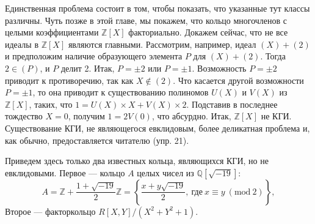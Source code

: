 \documentclass{mai_book}
\begin{document}
\begin{myproof}
Единственная проблема состоит в том, чтобы показать, что  
указанные тут классы различны. Чуть позже в этой главе, мы покажем, 
что кольцо многочленов с целыми коэффициентами $\mathbb{Z}[X]$  
факториально. Докажем сейчас, что не все идеалы в $\mathbb{Z}[X]$ являются  
главными. Рассмотрим, например, идеал $(X) + (2)$ и предположим наличие 
образующего элемента $P$ для $(X) + (2)$. Тогда $2 \in (P)$, и $P$ делит 2. 
Итак, $P = ±2$ или $P = ±1$. Возможность $P = ±2$ приводит к 
противоречию, так как $X \notin (2)$. Что касается другой  
возможности $P = ±1$, то она приводит к существованию полиномов $U(X)$ 
и $V(X)$ из $\mathbb{Z}[X]$, таких, что $1 = U(X) \times X + V(X) \times 2$. Подставив 
в последнее тождество $X = 0$, получим $1 = 2V(0)$, что абсурдно. 
Итак, $\mathbb{Z}[X]$ не КГИ. Существование КГИ, не являющегося  
евклидовым, более деликатная проблема и, как обычно, предоставляется 
читателю (упр. 21).

\noindent Приведем здесь только два известных кольца, являющихся КГИ, но 
не евклидовыми. Первое — кольцо $A$ целых чисел из $\mathbb{Q}[\sqrt{-19}]$:
\begin{equation*}
A = \mathbb{Z} + \frac{1 + \sqrt{-19}}{2}\mathbb{Z} = \left\{{\frac{x+y\sqrt{-19}}{2},\: \text{где}\: x \equiv y\: (\text{mod}\: 2)}\right\},
\end{equation*} 
Второе — факторкольцо $R[X, Y]\slash(X^2 + Y^2 + 1)$. 
\end{myproof}
\end{document}

